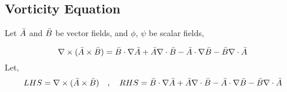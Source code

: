 \documentclass[class=report, 12pt, crop=false]{standalone}
\begin{document}
\begin{center}
\chapter{Vorticity Equation}
\begin{comment}

It is important that in the other works, the body acceleration is denoted as \b{F_b}, CHANGE IT TO \b{g_b}. This is important because \b{F_b} is misleading. We don't mean force, we mean the acceleration vector. So use \b{g_b} instead.


Results of a few reflections, we cannot just say that \f{D\rho}{Dt} = 0 for continuity. If we are to expand using \f{D\rho}{Dt} = 0, we will obtain the form, 0 = \f{\p\rho}{\p t} + v_i \f{\p\rho}{\p x_i}. The actual continuity governing equation: 0 = \f{\p\rho}{\p t} + \rho\f{\p}{\p x_j}(v_j) + v_j\f{\p\rho}{\p x_j}. Now if the divergence of velocity is zero, then the general continuity governing equation DEGENERATES into 0 = \f{D\rho}{Dt}. This means that that the observation 0 = \f{D\rho}{Dt} is only true for incompressible flow and could not represent the most general case of the continuity of fluids. Since an observation 0 = \f{D\rho}{Dt} fails to yield the most general case, then it is safe to assume that similar observations such as \b{a} = \f{D\b{v_f}}{Dt} will also likely fail to capture the full generality of the momentum governing equation.

Non-conervative form of the momentum equation referenced, please add the proof in a different part!

Please enforce consistency in notation. Please make sure that \b{v_f} is used when referring to fluid velocity throughout other documents. 

Please include a chapter about index notation!


Things to automate:
    making the $$$$ environments
    matrix environments
    Subscript and superscripts
    fractions
    includegraphics commands
    Copy Pasting if possible


\end{comment}




Let $\bar{A}$ and $\bar{B}$ be vector fields, and $\phi$, $\psi$ be scalar fields,

$$\nabla\times (\bar{A}\times \bar{B}) = \bar{B}\cdot\nabla \bar{A} + \bar{A}\nabla\cdot \bar{B} - \bar{A}\cdot\nabla \bar{B} - \bar{B}\nabla\cdot \bar{A}$$
Let,
$$LHS = \nabla\times (\bar{A}\times \bar{B}) \quad,\quad RHS = \bar{B}\cdot\nabla \bar{A} + \bar{A}\nabla\cdot \bar{B} - \bar{A}\cdot\nabla \bar{B} - \bar{B}\nabla\cdot \bar{A}$$


\end{center}
\end{document}
